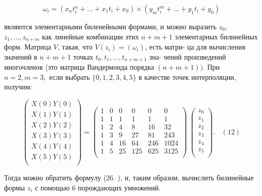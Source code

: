 \documentclass{mai_book}
\begin{document}
$$\omega_i=(x_nt_i^n+\ldots+x_1t_i+x_0)\times(y_mt_i^m+\ldots+y_1t_i+y_0) $$

\noindent являются элементарными биленейными формами, и можно выразить $z_0$,\linebreak
$z_1,\ldots,z_{n+m}$ как линейные комбинации этих $n+m+1$ элементарных\linebreak
билинейных форм. Матрица $V$, такая, что $V(z_i)=(\omega_i)$, есть матри-\linebreak
ца для вычисления значений в $n+m+1$ точках $t_0,t_1,\ldots,t_{n+m+1}$ зна-\linebreak
чений произведений многочленов (это матрица Вандермонда порядка\linebreak
$(n+m+1)).$ При $n=2,m=3,$ если выбрать $\{0,1,2,3,4,5\}$ в качестве\linebreak
точек интерполяции, получим: 

$$ 
\left(\begin{array}{c}
 X(0)Y(0) \\
 X(1)Y(1) \\
X(2)Y(2) \\
X(3)Y(3) \\
X(4)Y(4) \\
X(5)Y(5) \\
\end{array}\right)= 
\left(\begin{array}{cccccc}
1 & 0 & 0 & 0 & 0 & 0 \\
1 & 1 & 1 & 1 & 1 & 1 \\
1 & 2 & 4 & 8 & 16 & 32 \\
1 & 3 & 9 & 27 & 81 & 243 \\
1 & 4 & 16 & 64 & 246 & 1024 \\
1 & 5 & 25 & 125 & 625 & 3125 \\
\end{array}\right)~
\left(\begin{array}{c}
z_0 \\
 z_1 \\
z_2 \\
z_3 \\
z_4 \\
z_5  \\
\end{array}\right).~~~~(12) 
$$

\noindent Тогда можно обратить формулу (26. ), и, таким образом, вычислить\linebreak
билинейные формы $z_i$ с помощью 6 порождающих умножений. \\
\end{document}
